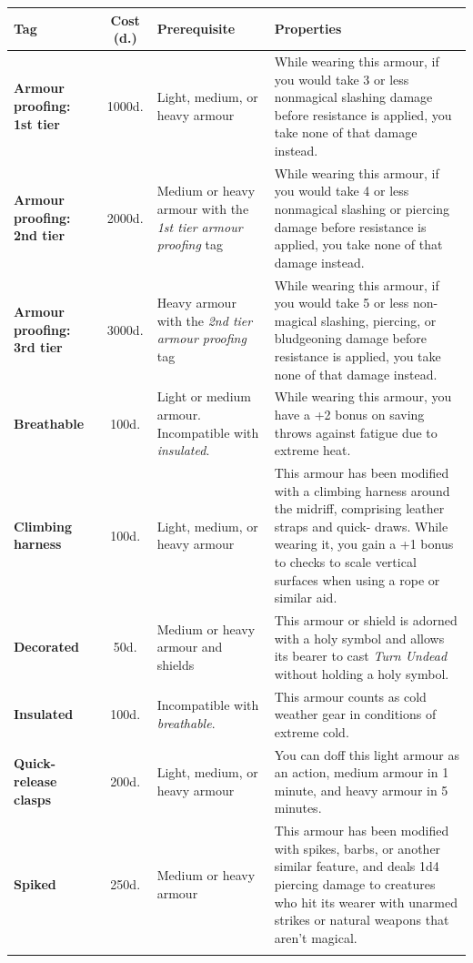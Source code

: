 \documentclass{book}
\begin{document}
	\begin{tabular}{p{1.5in} c p{1.3in} p{2.2in} }
		\toprule
			Tag & Cost (d.) & Prerequisite & Properties \\
		\midrule
			\textbf{Armour proofing: 1st tier} & 1000d. & Light, medium, or heavy
			armour & While wearing this armour, if you would take 3 or less
			nonmagical slashing damage before resistance is applied, you take none
			of that damage instead. \\
			\textbf{Armour proofing: 2nd tier} & 2000d. & Medium or heavy armour
			with the \emph{1st tier armour proofing} tag & While wearing this
			armour, if you would take 4 or less nonmagical slashing or piercing
			damage before resistance is applied, you take none of that damage
			instead. \\
			\textbf{Armour proofing: 3rd tier} & 3000d. & Heavy armour with the
			\emph{2nd tier armour proofing} tag & While wearing this armour, if you
			would take 5 or less non- magical slashing, piercing, or bludgeoning
			damage before resistance is applied, you take none of that damage
			instead. \\
			\textbf{Breathable} & 100d. & Light or medium armour. Incompatible with
			\emph{insulated}. & While wearing this armour, you have a +2 bonus on
			saving throws against fatigue due to extreme heat. \\
			\textbf{Climbing harness} & 100d. & Light, medium, or heavy armour &
			This armour has been modified with a climbing harness around the
			midriff, comprising leather straps and quick- draws. While wearing it,
			you gain a +1 bonus to checks to scale vertical surfaces when using a
			rope or similar aid. \\
			\textbf{Decorated} & 50d. & Medium or heavy armour and shields & This
			armour or shield is adorned with a holy symbol and allows its bearer to
			cast \emph{Turn Undead} without holding a holy symbol. \\
			\textbf{Insulated} & 100d. & Incompatible with \emph{breathable}. & This
			armour counts as cold weather gear in conditions of extreme cold. \\
			\textbf{Quick-release clasps} & 200d. & Light, medium, or heavy armour &
			You can doff this light armour as an action, medium armour in 1 minute,
			and heavy armour in 5 minutes. \\
			\textbf{Spiked} & 250d. & Medium or heavy armour & This armour has been
			modified with spikes, barbs, or another similar feature, and deals 1d4
			piercing damage to creatures who hit its wearer with unarmed strikes or
			natural weapons that aren't magical. \\
		\bottomrule\noalign{}
	\end{tabular}
\end{document}
